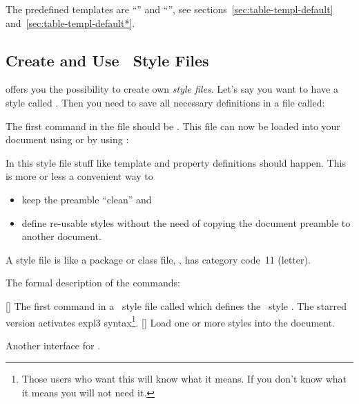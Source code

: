 \documentclass{xsim-manual}
\begin{document}
The predefined templates are \enquote{} and
\enquote{}, see sections~\vref{sec:table-templ-default}
and~\vref{sec:table-templ-default*}.

\subsection{Create and Use \xsim\ Style Files}\label{sec:style-files}

\xsim{} offers you the possibility to create own
\emph{style files}.  Let's say you want to have a style called
.  Then you need to save all necessary definitions in a file
called:
\begin{center}
\end{center}
The first command in the file should be .  This
file can now be loaded into your document using
 or by using
:

In this style file stuff like template and property definitions should
happen.  This is more or less a convenient way to
\begin{itemize}
  \item keep the preamble \enquote{clean} and
  \item define re-usable styles without the need of copying the document
    preamble to another document.
\end{itemize}
A style file is like a package or class file, \ie,  has category
code~11 (letter).

The formal description of the commands:
\begin{commands}
  [\sarg{}]
    The first command in a \xsim\ style file called
     which defines the \xsim\
    style .  The starred version activates expl3
    syntax\footnote{Those users who want this will know what it means.  If you
      don't know what it means you will not need it.}.
  []
    Load one or more styles into the document.
\end{commands}
\begin{options}
    Another interface for \marg{csv list
      of style names}.
\end{options}
\end{document}
